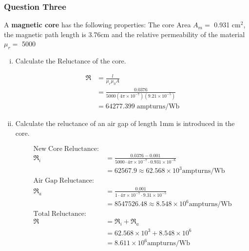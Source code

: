 \documentclass[a4paper,11pt]{article}
\begin{document}
\newpage
\subsubsection*{Question Three}
A \textbf{magnetic core} has the following properties: The core Area $A_m = $ 0.931 cm$^2$, the magnetic path length is 3.76cm and the relative permeability of the material $\mu_r = $ 5000

\begin{enumerate}[i.]
    \item Calculate the Reluctance of the core.

          \begin{align*}
              \mathfrak{R} & = \frac{l}{\mu_{r}\mu_{0}A}                                 \\
                           & = \frac{0.0376}{5000(4\pi\times10^{-7})(9.21\times10^{-5})} \\
                           & = 64277.399 \; \mathrm{ampturns/Wb}
          \end{align*}

    \item Calculate the reluctance of an air gap of length 1mm is introduced in the core.

          \begin{align*}
              \mathrm{New\;Core\;Reluctance:}                                                                \\
              \mathfrak{R}_i & = \frac{0.0376 - 0.001}{5000\cdot 4\pi\times10^{-7}\cdot 0.931\times 10^{-6}} \\
                             & = 62567.9 \approx 62.568\times 10^3 \mathrm{ampturns/Wb}                      \\
              \mathrm{Air\;Gap\;Reluctance:}                                                                 \\
              \mathfrak{R}_a & = \frac{0.001}{1\cdot 4\pi\times10^{-7}\cdot 9.31\times 10^{-5}}              \\
                             & = 8547526.48 \approx 8.548\times 10^6 \mathrm{ampturns/Wb}                    \\
              \mathrm{Total\;Reluctance:}                                                                    \\
              \mathfrak{R}   & = \mathfrak{R}_i + \mathfrak{R}_a                                             \\
                             & = 62.568\times 10^3 + 8.548\times 10^6                                        \\
                             & = 8.611\times 10^6 \mathrm{ampturns/Wb}
          \end{align*}


\end{enumerate}
\end{document}
